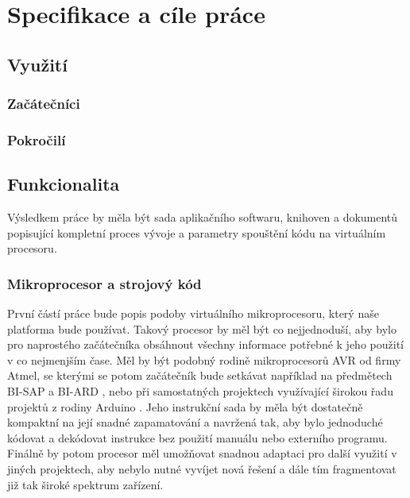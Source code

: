 \chapter{Specifikace a cíle práce}

\blind[1]

\section{Využití}

\blind[1]

\subsection{Začátečníci}

\blind[2]

\subsection{Pokročilí}

\blind[1]

\section{Funkcionalita}

Výsledkem práce by měla být sada aplikačního softwaru, knihoven a dokumentů popisující kompletní proces vývoje a parametry spouštění kódu na virtuálním procesoru.

\subsection{Mikroprocesor a strojový kód}

První částí práce bude popis podoby virtuálního mikroprocesoru, který naše platforma bude používat. Takový procesor by měl být co nejjednoduší, aby bylo pro naprostého začátečníka obsáhnout všechny informace potřebné k jeho použití v co nejmenjším čase. Měl by být podobný rodině mikroprocesorů AVR od firmy Atmel, se kterými se potom začátečník bude setkávat například na předmětech BI-SAP a BI-ARD , nebo při samostatných projektech využívající širokou řadu projektů z rodiny Arduino . Jeho instrukční sada by měla být dostatečně kompaktní na její snadné zapamatování a navržená tak, aby bylo jednoduché kódovat a dekódovat instrukce bez použití manuálu nebo externího programu. Finálně by potom procesor měl umožňovat snadnou adaptaci pro další využití v jiných projektech, aby nebylo nutné vyvíjet nová řešení a dále tím fragmentovat již tak široké spektrum zařízení.

